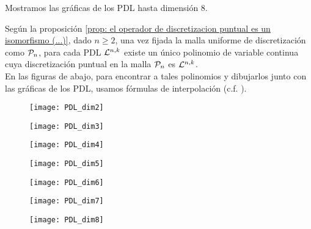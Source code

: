 Mostramos las gráficas de los PDL hasta dimensión $8$.
 
\begin{nota}
Según la proposición 
\ref{prop: el operador de discretizacion puntual es un isomorfismo (...)},
dado $n \geq 2$,
una vez fijada la malla uniforme de discretización
como $\mathcal{P}_{n}$,
para cada PDL $\mathcal{L}^{n,k}$
existe un único polinomio de variable
continua cuya discretización puntual en la
malla $\mathcal{P}_{n}$ es $\mathcal{L}^{n,k}$. \\


En las figuras de abajo, para encontrar a 
tales polinomios y dibujarlos junto con las
gráficas de los PDL, 
usamos fórmulas de interpolación (c.f. 
\cite{interpolation}).
\end{nota} 
 
\begin{figure}[H]
 	\centering
 	\texttt{[image: PDL\_dim2]} 
 \end{figure}	 

\begin{figure}[H]
 	\centering
 	\texttt{[image: PDL\_dim3]} 
 \end{figure}
 
 \begin{figure}[H]
 	\centering
 	\texttt{[image: PDL\_dim4]} 
 \end{figure}
 
  \begin{figure}[H]
 	\centering
 	\texttt{[image: PDL\_dim5]} 
 \end{figure}
 
   \begin{figure}[H]
 	\centering
 	\texttt{[image: PDL\_dim6]} 
 \end{figure}
 
   \begin{figure}[H]
 	\centering
 	\texttt{[image: PDL\_dim7]} 
 \end{figure}
 
   \begin{figure}[H]
 	\centering
 	\texttt{[image: PDL\_dim8]} 
 \end{figure}